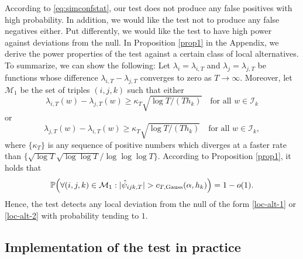 \documentclass[a4paper,12pt]{article}
\numberwithin{equation}{section}
\begin{document}
{According to \eqref{eq:simconfstat}, our test does not produce any false positives with high probability. In addition, we would like the test not to produce any false negatives either. Put differently, we would like the test to have high power against deviations from the null. 
In Proposition \ref{prop1} in the Appendix, we derive the power properties of the test against a certain class of local alternatives. To summarize, we can show the following: Let $\lambda_{i}= \lambda_{i, T}$ and $\lambda_j =\lambda_{j, T}$ be functions whose difference $\lambda_{i,T} - \lambda_{j,T}$ converges to zero as $T \to \infty$. Moreover, let $\mathcal{M}_1$ be the set of triples $(i,j,k)$ such that either
\begin{equation}\label{loc-alt-1}
\lambda_{i, T}(w) - \lambda_{j, T}(w) \ge \kappa_T \sqrt{\log T / (T h_{k})} \quad \text{for all } w \in \mathcal{I}_{k} 
\end{equation}
or 
\begin{equation}\label{loc-alt-2}
\lambda_{j, T}(w) - \lambda_{i, T}(w) \ge \kappa_T \sqrt{\log T / (T h_{k})} \quad \text{for all } w \in \mathcal{I}_{k}, 
\end{equation}
where $\{\kappa_T\}$ is any sequence of positive numbers which diverges at a faster rate than $\{ \sqrt{\log T} \sqrt{\log \log T} / \log \log \log T \}$. According to Proposition \ref{prop1}, it holds that 
\begin{equation}\label{eq:power}
\mathbb{P}\Big( \forall (i,j,k) \in \mathcal{M}_1: |\hat{\psi}_{ijk,T}| > c_{T,\textnormal{Gauss}}(\alpha,h_k) \Big) = 1 - o(1).
\end{equation}
Hence, the test detects any local deviation from the null of the form \eqref{loc-alt-1} or \eqref{loc-alt-2} with probability tending to $1$. 
}


\subsection{Implementation of the test in practice}\label{subsec:test:implementation}
\end{document}
